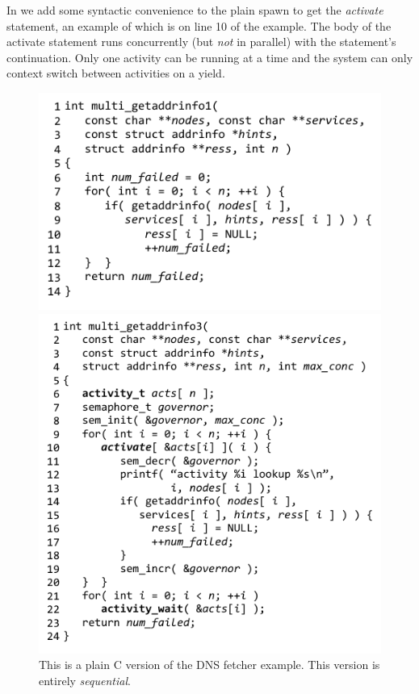 \documentclass[acmsmall,anonymous,review]{acmart}\settopmatter{printfolios=true,printccs=false,printacmref=false}
\begin{document}
In \charcoal{} we add some syntactic convenience to the plain spawn to get the \emph{activate} statement, an example of which is on line 10 of the example.
The body of the activate statement runs concurrently (but \emph{not} in parallel) with the statement's continuation.
Only one activity can be running at a time and the system can only context switch between activities on a yield.

\begin{figure}
    \centering
    \begin{minipage}[t]{0.47\textwidth}
        \centering
        \includegraphics[width=1.0\textwidth]{Code/multi_getaddrinfo_seq}
        \caption{This is a plain C version of the DNS fetcher example.
  This version is entirely \emph{sequential}.}
        \label{fig:charcoal_multidns_seq}
    \end{minipage}\hfill
    \begin{minipage}[t]{0.47\textwidth}
        \centering
        \includegraphics[width=1.0\textwidth]{Code/multi_getaddrinfo_sem}

\end{minipage}
\end{figure}
\end{document}
